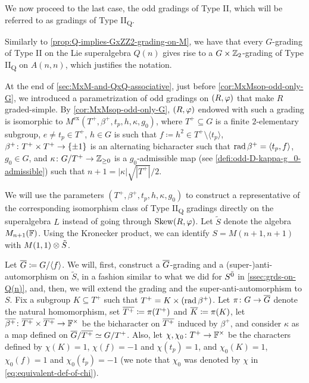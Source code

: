 We now proceed to the last case, the odd gradings of Type II, which will be referred to as gradings of Type II\textsubscript{Q}. 

\begin{remark}\label{prop:Q-implies-GxZZ2-grading-on-M-II}
    Similarly to \cref{prop:Q-implies-GxZZ2-grading-on-M}, we have that
    every $G$-grading of Type II on the Lie superalgebra $Q(n)$ gives rise to a $G\times \mathbb{Z}_2$-grading of Type II\textsubscript{Q} on $A(n,n)$, which justifies the notation.  
\end{remark}

At the end of \cref{sec:MxM-and-QxQ-associative}, just before \cref{cor:MxMsop-odd-only-G}, we introduced a parametrization of odd gradings on $(R, \varphi)$ that make $R$ graded-simple. 
By \cref{cor:MxMsop-odd-only-G}, $(R, \varphi)$ endowed with such a grading is isomorphic to $M^{\mathrm{ex}}(T^+, \beta^+, t_p, h, \kappa, g_0)$, where $T^+ \subseteq G$ is a finite $2$-elementary subgroup, $e\neq t_p \in T^+$, $h \in G$ is such that $f \coloneqq h^2 \in T^+ \setminus \langle t_p \rangle$, $\beta^+\colon T^+ \times T^+ \to \{ \pm 1 \}$ is an alternating bicharacter such that $\operatorname{rad} \beta^+ = \langle t_p, f \rangle$, $g_0\in G$, and $\kappa\colon G/T^+ \to \mathbb{Z}_{\geq 0}$ is a $g_0$-admissible map (see \cref{defi:odd-D-kappa-g_0-admissible}) such that $n+1 = |\kappa| \sqrt{|T^+|}/2$. 

We will use the parameters $(T^+, \beta^+, t_p, h, \kappa, g_0)$ to construct a representative of the corresponding isomorphism class of Type II\textsubscript{Q} gradings directly on the superalgebra $L$ instead of going through $\operatorname{Skew}(R, \varphi)$. 
Let $\tilde S$ denote the algebra $M_{n+1}(\mathbb{F})$. 
Using the Kronecker product, we can identify $S = M(n+1, n+1)$ with $M(1, 1) \otimes \tilde S$.

Let $\barr G \coloneqq G/\langle f \rangle$. 
We will, first, construct a $\barr G$-grading and a (super-)anti-automorphism on $\tilde S$, in a fashion similar to what we did for $S^{\bar0}$ in \cref{ssec:grds-on-Q(n)}, and, then, we will extend the grading and the super-anti-automorphism to $S$. 
Fix a subgroup $K \subseteq T^+$ such that $T^+ = K \times (\operatorname{rad} \beta^+)$. 
Let $\pi\from G \to \barr G$ denote the natural homomorphism, set $\barr {T^+} \coloneqq \pi(T^+)$ and $\barr {K} \coloneqq \pi(K)$, let $\barr {\beta^+}\from \barr {T^+} \times \barr {T^+} \to \FF^\times$ be the bicharacter on $\barr {T^+}$ induced by $\beta^+$, and consider $\kappa$ as a map defined on $\barr G/\barr {T^+} \iso G/{T^+}$. 
Also, let $\chi,\chi_0 \colon T^+ \to \mathbb{F}^\times$ be the characters defined by $\chi(K) = 1$, $\chi(f) = -1$ and $\chi(t_p) = 1$, and $\chi_0(K) = 1$, $\chi_0(f) = 1$ and $\chi_0(t_p) = -1$ (we note that $\chi_0$ was denoted by $\chi$ in \cref{eq:equivalent-def-of-chi}). 

